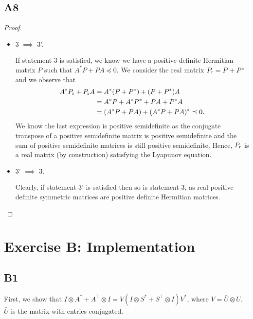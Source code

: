 \documentclass[11pt]{article}
\newcommand{\kp}{\otimes}
\begin{document}
\subsection*{A8}
\begin{proof}\leavevmode
\begin{itemize}
	\item 3 \(\implies\) 3'.
	
	If statement 3 is satisfied, we know we have a positive definite Hermitian matrix $P$ such that $A^*P+PA \preceq 0$. We consider the real matrix $P_\textnormal{r}=P+P^*$ and we observe that
	\begin{align*}
	A^* P_\textnormal{r}+P_\textnormal{r} A &= A^*(P+P^*)+(P+P^*)A\\
	&= A^*P+A^*P^*+PA+P^*A\\
	&= (A^*P+PA)+(A^*P+PA)^* \preceq 0.
	\end{align*}
	We know the last expression is positive semidefinite as the conjugate transpose of a positive semidefinite matrix is positive semidefinite and the sum of positive semidefinite matrices is still positive semidefinite. Hence, $P_\textnormal{r}$ is a real matrix (by construction) satisfying the Lyapunov equation.
	\item 3' \(\implies\) 3.
	
	Clearly, if statement 3' is satisfied then so is statement 3, as real positive definite symmetric matrices are positive definite Hermitian matrices.
\end{itemize}
\end{proof}

\section*{Exercise B: Implementation}
\subsection*{B1}
First, we show that $I \kp A^{*} + A^\top \kp I = V (I \kp S^{*} + S^\top \kp I) V^{*}$, where \(V = \bar{U} \kp U\).
\(\bar{U}\) is the matrix with entries conjugated.
\end{document}

